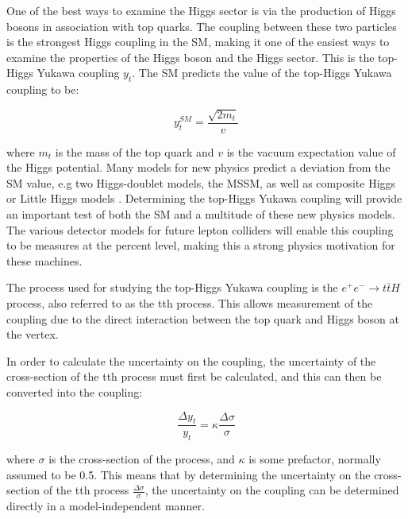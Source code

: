 One of the best ways to examine the Higgs sector is via the production of Higgs bosons in association with top quarks. The coupling between these two particles is the strongest Higgs coupling in the \acrshort{SM}, making it one of the easiest ways to examine the properties of the Higgs boson and the Higgs sector. This is the top-Higgs Yukawa coupling $y_t$. The \acrlong{SM} predicts the value of the top-Higgs Yukawa coupling to be:

\begin{equation}
	y_t^{SM} = \frac{\sqrt{2m_t}}{v}
\label{eq:yukawacoupling-sm-value}
\end{equation}

where $m_t$ is the mass of the top quark and $v$ is the vacuum expectation value of the Higgs potential. Many models for new physics predict a deviation from the \acrshort{SM} value, e.g two Higgs-doublet models, the \acrfull{MSSM}, as well as composite Higgs or Little Higgs models  . Determining the top-Higgs Yukawa coupling will provide an important test of both the \acrlong{SM} and a multitude of these new physics models. The various detector models for future lepton colliders will enable this coupling to be measures at the percent level, making this a strong physics motivation for these machines.

The process used for studying the top-Higgs Yukawa coupling is the $e^+ e^- \rightarrow t\overline{t}H$ process, also referred to as the tth process. This allows measurement of the coupling due to the direct interaction between the top quark and Higgs boson at the vertex.

In order to calculate the uncertainty on the coupling, the uncertainty of the cross-section of the tth process must first be calculated, and this can then be converted into the coupling:

\begin{equation}
	\frac{\Delta y_t}{y_t} = \kappa \frac{\Delta \sigma}{\sigma}
\label{eq:crosssection-to-yukawa}
\end{equation}

where $\sigma$ is the cross-section of the process, and $\kappa$ is some prefactor, normally assumed to be 0.5. This means that by determining the uncertainty on the cross-section of the tth process $\frac{\Delta \sigma}{\sigma}$, the uncertainty on the coupling can be determined directly in a model-independent manner. 


